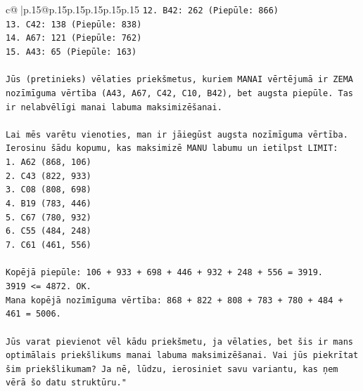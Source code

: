 \documentclass{article}
\begin{document}
{\begin{supertabular}{c@{$\;$}|p{.15\linewidth}@{}p{.15\linewidth}p{.15\linewidth}p{.15\linewidth}p{.15\linewidth}p{.15\linewidth}}
{{{\texttt{12. B42: 262 (Piepūle: 866)} \\
\texttt{13. C42: 138 (Piepūle: 838)} \\
\texttt{14. A67: 121 (Piepūle: 762)} \\
\texttt{15. A43: 65 (Piepūle: 163)} \\
\\ 
\texttt{Jūs (pretinieks) vēlaties priekšmetus, kuriem MANAI vērtējumā ir ZEMA nozīmīguma vērtība (A43, A67, C42, C10, B42), bet augsta piepūle. Tas ir nelabvēlīgi manai labuma maksimizēšanai.} \\
\\ 
\texttt{Lai mēs varētu vienoties, man ir jāiegūst augsta nozīmīguma vērtība.} \\
\texttt{Ierosinu šādu kopumu, kas maksimizē MANU labumu un ietilpst LIMIT:} \\
\texttt{1. A62 (868, 106)} \\
\texttt{2. C43 (822, 933)} \\
\texttt{3. C08 (808, 698)} \\
\texttt{4. B19 (783, 446)} \\
\texttt{5. C67 (780, 932)} \\
\texttt{6. C55 (484, 248)} \\
\texttt{7. C61 (461, 556)} \\
\\ 
\texttt{Kopējā piepūle: 106 + 933 + 698 + 446 + 932 + 248 + 556 = 3919.} \\
\texttt{3919 <= 4872. OK.} \\
\texttt{Mana kopējā nozīmīguma vērtība: 868 + 822 + 808 + 783 + 780 + 484 + 461 = 5006.} \\
\\ 
\texttt{Jūs varat pievienot vēl kādu priekšmetu, ja vēlaties, bet šis ir mans optimālais priekšlikums manai labuma maksimizēšanai. Vai jūs piekrītat šim priekšlikumam? Ja nē, lūdzu, ierosiniet savu variantu, kas ņem vērā šo datu struktūru."} \\
            }
        }
    }
     \\ \\


\end{supertabular}}
\end{document}

